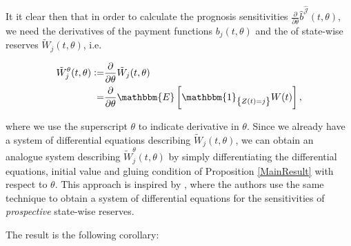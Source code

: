 \documentclass{article}
\newcommand{\1}[1]{\mathbbm{1}_{\left\lbrace #1 \right\rbrace}}
\newcommand{\expec}[1][def]{\mathbbm{E} \left[ #1 \right]}
\theoremstyle{break}
\theoremstyle{remark}
\numberwithin{equation}{section}
\begin{document}
It it clear then that in order to calculate the prognosis sensitivities $\frac{\partial}{\partial \theta} \hat{b}^{\hat{\mathcal{J}}}(t,\theta)$, we need the derivatives of the payment functions $b_j(t,\theta)$ and the of state-wise reserves $\tilde{W}_j(t,\theta)$, i.e.

\begin{align*}
	\tilde{W}_j^\theta(t,\theta) :=& \frac{\partial}{\partial \theta} \tilde{W}_j(t,\theta) \\
	=& \frac{\partial}{\partial \theta} \expec[\1{Z(t)=j} W(t)],
\end{align*}

where we use the superscript $\theta$ to indicate derivative in $\theta$. Since we already have a system of differential equations describing $\tilde{W}_j(t,\theta)$, we can obtain an analogue system describing $\tilde{W}_j^\theta(t,\theta)$ by simply differentiating the differential equations, initial value and gluing condition of Proposition \ref{MainResult} with respect to $\theta$. This approach is inspired by \cite{Kalashnikov}, where the authors use the same technique to obtain a system of differential equations for the sensitivities of \textit{prospective} state-wise reserves.

The result is the following corollary:
\end{document}
